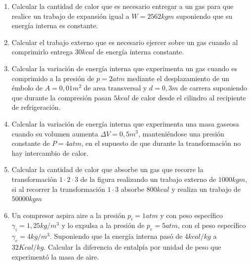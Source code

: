 \documentclass[../main]{subfiles}
\begin{document}
\begin{enumerate}
  \item Calcular la cantidad de calor que es necesario entregar a un
    gas para que realice un trabajo de expansión igual a $W=2562kgm$
    suponiendo que su energía interna es constante.
  \item Calcular el trabajo externo que es necesario ejercer sobre un
    gas cuando al comprimirlo entrega $30kcal$ de energía interna constante.
  \item Calcular la variación de energía interna que experimenta un
    gas cuando es comprimido a la presión de $p=2atm$ mediante el
    desplazamiento de un émbolo de $A=0,01m^2$ de area transversal y
    $d=0,3m$ de carrera suponiendo que durante la compresión pasan
    $5kcal$ de calor desde el cilindro al recipiente de refrigeración.
  \item Calcular la variación de energía interna que experimenta una
    masa gaseosa cuando su volumen aumenta $\Delta V=0,5m^3$,
    manteniéndose una presión constante de $P=4atm$, en el supuesto
    de que durante la transformación no hay intercambio de calor.
  \item Calcular la cantidad de calor que absorbe un gas que recorre
    la transformación $1\cdot2\cdot3$ de la figura realizando un
    trabajo externo de $1000kgm$, si al recorrer la transformación
    $1\cdot3$ absorbe $800kcal$ y realiza un trabajo de $50000kgm$

    \begin{center}
    \end{center}

  \item Un compresor aspira aire a la presión $p_i=1atm$ y con  peso
    específico $\gamma_{i}=1,25kg/m^3$ y lo expulsa a la presión de
    $p_e=5atm$, con el peso específico $\gamma_e=4kg/m^3$. Suponiendo
    que la energía interna pasó de $4kcal/kg$ a $32 Kcal/kg$.
    Calcular la diferencia de entalpía por unidad de peso que
    experimentó la masa de aire.

\end{enumerate}
\end{document}
